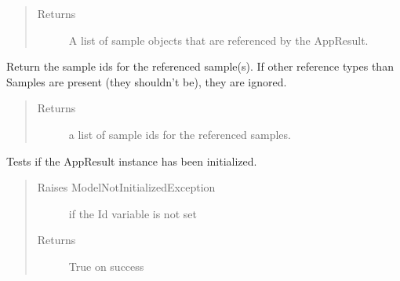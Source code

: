\documentclass[letterpaper,10pt,english]{sphinxmanual}
\begin{document}
\begin{fulllineitems}
\begin{fulllineitems}
\begin{quote}
\begin{description}
\item[{Returns}] \leavevmode
A list of sample objects that are referenced by the AppResult.

\end{description}\end{quote}

\end{fulllineitems}


\begin{fulllineitems}
\label{Available modules:BaseSpacePy.model.AppResult.AppResult.getReferencedSamplesIds}
Return the sample ids for the referenced sample(s). 
If other reference types than Samples are present (they shouldn't be), they are ignored.
\begin{quote}\begin{description}
\item[{Returns}] \leavevmode
a list of sample ids for the referenced samples.

\end{description}\end{quote}

\end{fulllineitems}


\begin{fulllineitems}
\label{Available modules:BaseSpacePy.model.AppResult.AppResult.isInit}
Tests if the AppResult instance has been initialized.
\begin{quote}\begin{description}
\item[{Raises ModelNotInitializedException}] \leavevmode
if the Id variable is not set

\item[{Returns}] \leavevmode
True on success

\end{description}\end{quote}

\end{fulllineitems}



\end{fulllineitems}
\end{document}
